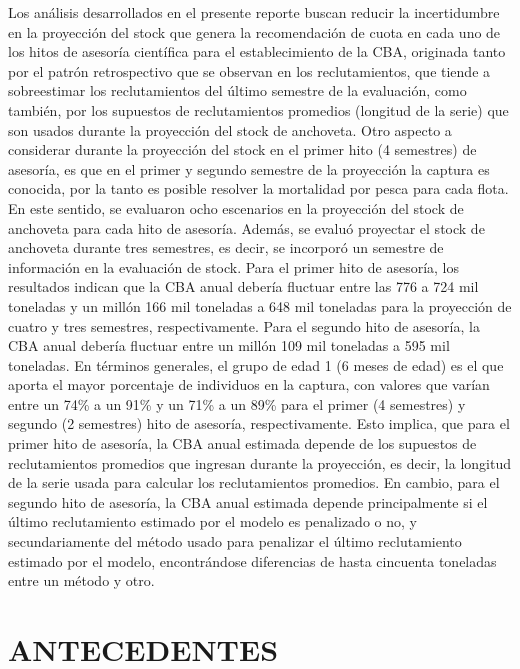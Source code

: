 \documentclass[letter,11pt]{article}
\begin{document}
Los an\'alisis desarrollados en el presente reporte buscan reducir la
incertidumbre en la proyecci\'on del stock que genera la recomendaci\'on de
cuota en cada uno de los hitos de asesor\'ia cient\'ifica para el establecimiento de la
CBA, originada tanto por el patr\'on retrospectivo que se observan en los reclutamientos,
que tiende a sobreestimar los reclutamientos del \'ultimo semestre de la evaluaci\'on, como
tambi\'en, por los supuestos de reclutamientos promedios (longitud de la serie) que son usados
durante la proyecci\'on del stock de anchoveta. Otro aspecto a considerar durante la
proyecci\'on del stock en el primer hito (4 semestres) de asesor\'ia, es que en el primer
y segundo semestre de la proyecci\'on la captura es conocida, por la tanto es posible
resolver la mortalidad por pesca para cada flota.\\

En este sentido, se evaluaron ocho escenarios en la proyecci\'on del
stock de anchoveta para cada hito de asesor\'ia. Adem\'as, se evalu\'o proyectar
el stock de anchoveta durante tres semestres, es decir, se incorpor\'o un semestre 
de informaci\'on en la evaluaci\'on de stock. Para el primer hito de asesor\'ia, los
resultados indican que la CBA anual deber\'ia fluctuar entre las 776 a 724 mil toneladas
y un mill\'on 166 mil toneladas a 648 mil toneladas para la proyecci\'on de cuatro y
tres semestres, respectivamente. Para el segundo hito de asesor\'ia, la CBA anual deber\'ia
fluctuar entre un mill\'on 109 mil toneladas a 595 mil toneladas. En t\'erminos generales,
el grupo de edad 1 (6 meses de edad) es el que aporta el mayor porcentaje de individuos en
la captura, con valores que var\'ian entre un 74\% a un 91\% y un 71\% a un 89\% para el primer
(4 semestres) y segundo (2 semestres) hito de asesor\'ia, respectivamente. Esto implica, que
para el primer hito de asesor\'ia, la CBA anual estimada depende de los supuestos de reclutamientos promedios que ingresan durante la proyecci\'on, es decir, la longitud de la serie usada para
calcular los reclutamientos promedios. En cambio, para el segundo hito de asesor\'ia, la CBA
anual estimada depende principalmente si el \'ultimo reclutamiento estimado por el modelo es
penalizado o no, y secundariamente del m\'etodo usado para penalizar el \'ultimo reclutamiento
estimado por el modelo, encontr\'andose diferencias de hasta cincuenta toneladas entre un m\'etodo
y otro.\\


\clearpage
\pagebreak


\section{ANTECEDENTES}
\end{document}

